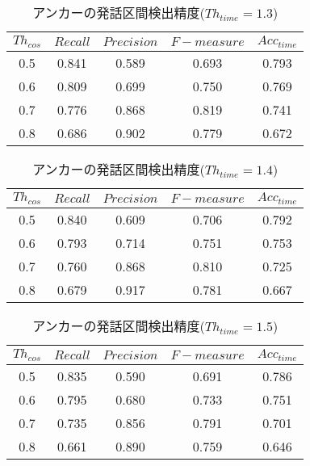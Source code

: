 \begin{table}[H]
  \begin{center}
    \caption{アンカーの発話区間検出精度($Th_{time}=1.3$) \label{table:result_get_anchor13}}
    \begin{tabular}{|c||c|c|c|c|} \hline
      $Th_{cos}$ & $Recall$ & $Precision$ & $F-measure$ & $Acc_{time}$\\ \hline
0.5 & 0.841 & 0.589 & 0.693 & 0.793 \\ \hline
0.6 & 0.809 & 0.699 & 0.750 & 0.769 \\ \hline
0.7 & 0.776 & 0.868 & 0.819 & 0.741 \\ \hline
0.8 & 0.686 & 0.902 & 0.779 & 0.672 \\ \hline

    \end{tabular}
  \end{center}
\end{table}

\begin{table}[H]
  \begin{center}
    \caption{アンカーの発話区間検出精度($Th_{time}=1.4$) \label{table:result_get_anchor14}}
    \begin{tabular}{|c||c|c|c|c|} \hline
      $Th_{cos}$ & $Recall$ & $Precision$ & $F-measure$ & $Acc_{time}$\\ \hline
0.5 & 0.840 & 0.609 & 0.706 & 0.792 \\ \hline
0.6 & 0.793 & 0.714 & 0.751 & 0.753 \\ \hline
0.7 & 0.760 & 0.868 & 0.810 & 0.725 \\ \hline
0.8 & 0.679 & 0.917 & 0.781 & 0.667 \\ \hline

    \end{tabular}
  \end{center}
\end{table}

\begin{table}[H]
  \begin{center}
    \caption{アンカーの発話区間検出精度($Th_{time}=1.5$) \label{table:result_get_anchor15}}
    \begin{tabular}{|c||c|c|c|c|} \hline
      $Th_{cos}$ & $Recall$ & $Precision$ & $F-measure$ & $Acc_{time}$\\ \hline
0.5 & 0.835 & 0.590 & 0.691 & 0.786 \\ \hline
0.6 & 0.795 & 0.680 & 0.733 & 0.751 \\ \hline
0.7 & 0.735 & 0.856 & 0.791 & 0.701 \\ \hline
0.8 & 0.661 & 0.890 & 0.759 & 0.646 \\ \hline

    \end{tabular}
  \end{center}
\end{table}

